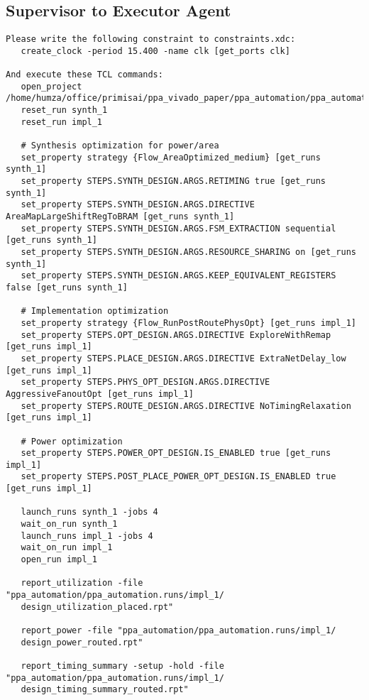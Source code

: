 \subsection{Supervisor to Executor Agent}
\vspace{-0.5em}
\begin{supervisorbox}
\begin{lstlisting}
Please write the following constraint to constraints.xdc:
   create_clock -period 15.400 -name clk [get_ports clk]
   
And execute these TCL commands:
   open_project /home/humza/office/primisai/ppa_vivado_paper/ppa_automation/ppa_automation.xpr
   reset_run synth_1
   reset_run impl_1
   
   # Synthesis optimization for power/area
   set_property strategy {Flow_AreaOptimized_medium} [get_runs synth_1]
   set_property STEPS.SYNTH_DESIGN.ARGS.RETIMING true [get_runs synth_1]
   set_property STEPS.SYNTH_DESIGN.ARGS.DIRECTIVE AreaMapLargeShiftRegToBRAM [get_runs synth_1]
   set_property STEPS.SYNTH_DESIGN.ARGS.FSM_EXTRACTION sequential [get_runs synth_1]
   set_property STEPS.SYNTH_DESIGN.ARGS.RESOURCE_SHARING on [get_runs synth_1]
   set_property STEPS.SYNTH_DESIGN.ARGS.KEEP_EQUIVALENT_REGISTERS false [get_runs synth_1]
   
   # Implementation optimization
   set_property strategy {Flow_RunPostRoutePhysOpt} [get_runs impl_1]
   set_property STEPS.OPT_DESIGN.ARGS.DIRECTIVE ExploreWithRemap [get_runs impl_1]
   set_property STEPS.PLACE_DESIGN.ARGS.DIRECTIVE ExtraNetDelay_low [get_runs impl_1]
   set_property STEPS.PHYS_OPT_DESIGN.ARGS.DIRECTIVE AggressiveFanoutOpt [get_runs impl_1]
   set_property STEPS.ROUTE_DESIGN.ARGS.DIRECTIVE NoTimingRelaxation [get_runs impl_1]
   
   # Power optimization
   set_property STEPS.POWER_OPT_DESIGN.IS_ENABLED true [get_runs impl_1]
   set_property STEPS.POST_PLACE_POWER_OPT_DESIGN.IS_ENABLED true [get_runs impl_1]
   
   launch_runs synth_1 -jobs 4
   wait_on_run synth_1
   launch_runs impl_1 -jobs 4
   wait_on_run impl_1
   open_run impl_1
   
   report_utilization -file "ppa_automation/ppa_automation.runs/impl_1/
   design_utilization_placed.rpt"
   
   report_power -file "ppa_automation/ppa_automation.runs/impl_1/
   design_power_routed.rpt"
   
   report_timing_summary -setup -hold -file "ppa_automation/ppa_automation.runs/impl_1/
   design_timing_summary_routed.rpt"
\end{lstlisting}
\end{supervisorbox}

